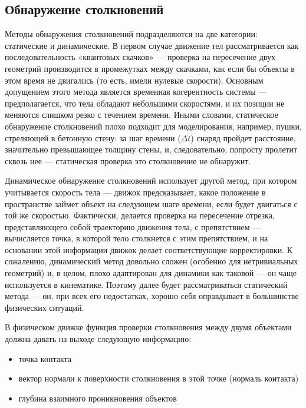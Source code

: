 \subsection{Обнаружение столкновений}
Методы обнаружения столкновений подразделяются на две категории: статические и динамические. В первом случае
движение тел рассматривается как последовательность «квантовых скачков» --- проверка на пересечение двух геометрий
производится в промежутках между скачками, как если бы объекты в этом время не двигались (то есть, имели нулевые
скорости). Основным допущением этого метода является временная когерентность системы --- предполагается, что тела
обладают небольшими скоростями, и их позиции не меняются слишком резко с течением времени. Иными словами,
статическое обнаружение столкновений плохо подходит для моделирования, например, пушки, стреляющей в бетонную
стену: за шаг времени ($\Delta{t}$) снаряд пройдет расстояние, значительно превышающее толщину стены, и, следовательно,
попросту пролетит сквозь нее --- статическая проверка это столкновение не обнаружит.

Динамическое обнаружение столкновений использует другой метод, при котором учитывается скорость тела --- движок
предсказывает, какое положение в пространстве займет объект на следующем шаге времени, если будет двигаться с той же
скоростью. Фактически, делается проверка на пересечение отрезка, представляющего собой траекторию движения тела, с
препятствием --- вычисляется точка, в которой тело столкнется с этим препятствием, и на основании этой информации движок
делает соответствующие корректировки. К сожалению, динамический метод довольно сложен (особенно для
нетривиальных геометрий) и, в целом, плохо адаптирован для динамики как таковой --- он чаще используется в кинематике.
Поэтому далее будет рассматриваться статический метода --- он, при всех его недостатках, хорошо себя оправдывает в
большинстве физических ситуаций.

В физическом движке функция проверки столкновения между двумя объектами должна давать на выходе следующую
информацию:
\begin{itemize}
  \item точка контакта
  \item вектор нормали к поверхности столкновения в этой точке (нормаль контакта)
  \item глубина взаимного проникновения объектов
\end{itemize}

